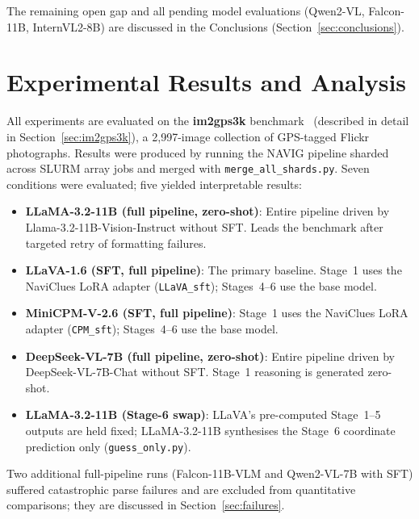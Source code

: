 \documentclass[11pt]{article}
\begin{document}
The remaining open gap and all pending model evaluations (Qwen2-VL, Falcon-11B,
InternVL2-8B) are discussed in the Conclusions (Section~\ref{sec:conclusions}).

\section{Experimental Results and Analysis}
\label{sec:results}

All experiments are evaluated on the \textbf{im2gps3k} benchmark~\citep{Vo2017IM2GPS3K}
(described in detail in Section~\ref{sec:im2gps3k}), a 2{,}997-image collection of
GPS-tagged Flickr photographs. Results were produced by running the NAVIG pipeline
sharded across SLURM array jobs and merged with \texttt{merge\_all\_shards.py}.
Seven conditions were evaluated; five yielded interpretable results:

\begin{itemize}[noitemsep]
  \item \textbf{LLaMA-3.2-11B (full pipeline, zero-shot)}: Entire pipeline driven by
    Llama-3.2-11B-Vision-Instruct without SFT. Leads the benchmark after targeted
    retry of formatting failures.
  \item \textbf{LLaVA-1.6 (SFT, full pipeline)}: The primary baseline. Stage~1 uses
    the NaviClues LoRA adapter (\texttt{LLaVA\_sft}); Stages~4--6 use the base model.
  \item \textbf{MiniCPM-V-2.6 (SFT, full pipeline)}: Stage~1 uses the NaviClues
    LoRA adapter (\texttt{CPM\_sft}); Stages~4--6 use the base model.
  \item \textbf{DeepSeek-VL-7B (full pipeline, zero-shot)}: Entire pipeline driven by
    DeepSeek-VL-7B-Chat without SFT. Stage~1 reasoning is generated zero-shot.
  \item \textbf{LLaMA-3.2-11B (Stage-6 swap)}: LLaVA's pre-computed Stage~1--5 outputs
    are held fixed; LLaMA-3.2-11B synthesises the Stage~6 coordinate prediction only
    (\texttt{guess\_only.py}).
\end{itemize}

Two additional full-pipeline runs (Falcon-11B-VLM and Qwen2-VL-7B with SFT) suffered
catastrophic parse failures and are excluded from quantitative comparisons; they are
discussed in Section~\ref{sec:failures}.

\end{document}
